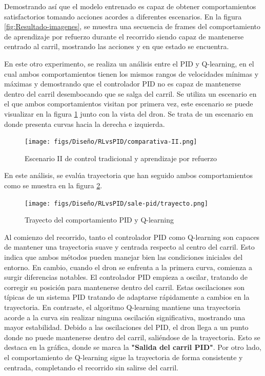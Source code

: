 Demostrando así que el modelo entrenado es capaz de obtener comportamientos satisfactorios tomando acciones acordes a diferentes escenarios. En la figura \ref{fig:Resultado-imagenes}, 
se muestra una secuencia de frames
del comportamiento de aprendizaje por refuerzo durante el recorrido siendo capaz de mantenerse centrado al carril, mostrando las acciones y en que estado se encuentra. \newline

En este otro experimento, se realiza un análisis entre el PID y Q-learning, en el cual ambos comportamientos tienen los mismos rangos de velocidades mínimas y máximas y demostrando que
el controlador PID no es capaz de mantenerse dentro del carril desembocando que se salga 
del carril. Se utiliza un escenario en el que ambos comportamientos visitan por primera vez, este escenario se puede visualizar en la figura \ref{fig:escenario-comparativa-II} junto 
con la vista del dron. Se trata de un escenario en donde presenta curvas hacia la derecha e izquierda.

\begin{figure} [H]
  \begin{center}
    \texttt{[image: figs/Diseño/RLvsPID/comparativa-II.png]}
  \end{center}
  \caption{Escenario II de control tradicional y aprendizaje por refuerzo}
  \label{fig:escenario-comparativa-II}
\end{figure}

En este análisis, se evalúa trayectoria que han seguido ambos comportamientos como se muestra en la figura \ref{fig:Trayecto-II}. 

\begin{figure} [H]
  \begin{center}
    \texttt{[image: figs/Diseño/RLvsPID/sale-pid/trayecto.png]}
  \end{center}
  \caption{Trayecto del comportamiento PID y Q-learning}
  \label{fig:Trayecto-II}
\end{figure}

Al comienzo del recorrido, tanto el controlador PID como Q-learning
son capaces de mantener una trayectoria suave y centrada respecto al centro del carril. Esto indica que ambos métodos pueden manejar bien las condiciones iniciales del entorno. En cambio, cuando 
el dron se enfrenta a la primera curva, comienza a surgir diferencias notables. El controlador PID empieza a oscilar, tratando de corregir su posición para mantenerse dentro del carril. Estas 
oscilaciones son típicas de un sistema PID tratando de adaptarse rápidamente a cambios en la trayectoria. En contraste, el algoritmo Q-learning mantiene una trayectoria acorde a la curva 
sin realizar ninguna oscilación significativa, mostrando una mayor estabilidad. Debido a las oscilaciones del PID, el dron llega a un punto donde no puede mantenerse dentro del carril, saliéndose 
de la trayectoria. Esto se destaca en la gráfica, donde se marca la \textbf{"Salida del carril PID"}. Por otro lado, el comportamiento de Q-learning sigue la trayectoria  de forma consistente 
y centrada, completando el recorrido sin salirse del carril. \newline

